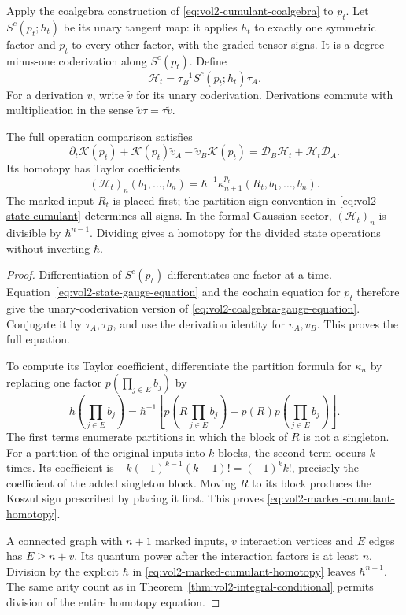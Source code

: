 Apply the coalgebra construction of
\eqref{eq:vol2-cumulant-coalgebra} to $p_t$.
Let $S^c(p_t;h_t)$ be its unary tangent map: it applies
$h_t$ to exactly one symmetric factor and $p_t$ to every
other factor, with the graded tensor signs. It is a
degree-minus-one coderivation along $S^c(p_t)$.
Define
\[
 \mathcal H_t=\tau_B^{-1}S^c(p_t;h_t)\tau_A.
\]
For a derivation $v$, write $\widetilde v$ for its unary
coderivation. Derivations commute with multiplication
in the sense $\widetilde v\tau=\tau\widetilde v$.

\begin{theorem}\label{thm:vol2-marked-cumulant-homotopy}
The full operation comparison satisfies
\begin{equation}\label{eq:vol2-coalgebra-gauge-equation}
 \partial_t\mathscr K(p_t)
  +\mathscr K(p_t)\widetilde v_A
  -\widetilde v_B\mathscr K(p_t)
     =\mathscr D_B\mathcal H_t+\mathcal H_t\mathscr D_A.
\end{equation}
Its homotopy has Taylor coefficients
\begin{equation}\label{eq:vol2-marked-cumulant-homotopy}
 (\mathcal H_t)_n(b_1,\ldots,b_n)
       =\hbar^{-1}\kappa_{n+1}^{p_t}(R_t,b_1,\ldots,b_n).
\end{equation}
The marked input $R_t$ is placed first; the partition
sign convention in \eqref{eq:vol2-state-cumulant}
determines all signs. In the formal Gaussian sector,
$(\mathcal H_t)_n$ is divisible by $\hbar^{n-1}$.
Dividing gives a homotopy for the divided state operations
without inverting $\hbar$.
\end{theorem}
\begin{proof}
Differentiation of $S^c(p_t)$ differentiates one factor
at a time. Equation~\eqref{eq:vol2-state-gauge-equation}
and the cochain equation for $p_t$ therefore give the
unary-coderivation version of
\eqref{eq:vol2-coalgebra-gauge-equation}.
Conjugate it by $\tau_A,\tau_B$, and use the derivation
identity for $v_A,v_B$. This proves the full equation.

To compute its Taylor coefficient, differentiate the
partition formula for $\kappa_n$ by replacing one factor
$p(\prod_{j\in E}b_j)$ by
\[
 h\left(\prod_{j\in E}b_j\right)
 =\hbar^{-1}\left[
       p\left(R\prod_{j\in E}b_j\right)
           -p(R)p\left(\prod_{j\in E}b_j\right)\right].
\]
The first terms enumerate partitions in which the block
of $R$ is not a singleton. For a partition of the original
inputs into $k$ blocks, the second term occurs $k$ times.
Its coefficient is
$-k(-1)^{k-1}(k-1)!=(-1)^k k!$, precisely the coefficient
of the added singleton block. Moving $R$ to its block
produces the Koszul sign prescribed by placing it first.
This proves \eqref{eq:vol2-marked-cumulant-homotopy}.

A connected graph with $n+1$ marked inputs, $v$ interaction
vertices and $E$ edges has $E\geq n+v$.
Its quantum power after the interaction factors is at
least $n$. Division by the explicit $\hbar$ in
\eqref{eq:vol2-marked-cumulant-homotopy} leaves
$\hbar^{n-1}$. The same arity count as in
Theorem~\ref{thm:vol2-integral-conditional} permits division
of the entire homotopy equation.
\end{proof}


